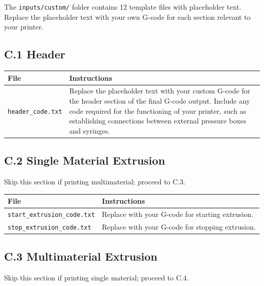 \documentclass[11pt,letterpaper]{article}
\newcommand{\code}[1]{\texttt{#1}}
\begin{document}
The \code{inputs/custom/} folder contains 12 template files with placeholder text. Replace the placeholder text with your own G-code for each section relevant to your printer.

\subsection{C.1 Header}

\begin{longtable}{@{}p{3cm}p{11cm}@{}}
\toprule
\textbf{File} & \textbf{Instructions} \\
\midrule
\code{header\_code.txt} & Replace the placeholder text with your custom G-code for the header section of the final G-code output. Include any code required for the functioning of your printer, such as establishing connections between external pressure boxes and syringes. \\
\bottomrule
\end{longtable}

\subsection{C.2 Single Material Extrusion}

Skip this section if printing multimaterial; proceed to C.3.

\begin{longtable}{@{}L{5cm}p{9cm}@{}}
\toprule
\textbf{File} & \textbf{Instructions} \\
\midrule
\code{start\_extrusion\_code.txt} & Replace with your G-code for starting extrusion. \\
\code{stop\_extrusion\_code.txt} & Replace with your G-code for stopping extrusion. \\
\bottomrule
\end{longtable}

\subsection{C.3 Multimaterial Extrusion}

Skip this section if printing single material; proceed to C.4.
\end{document}
